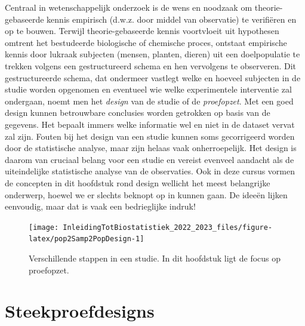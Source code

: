 \documentclass[
  12pt,dutch,coursenotes]{book}
\begin{document}
Centraal in wetenschappelijk onderzoek is de wens en noodzaak om
theorie-gebaseerde kennis empirisch (d.w.z. door middel van observatie) te
verifiëren en op te bouwen. Terwijl theorie-gebaseerde kennis voortvloeit uit hypothesen
omtrent het bestudeerde biologische of chemische proces, ontstaat empirische
kennis door lukraak subjecten (mensen, planten, dieren) uit een doelpopulatie te
trekken volgens een gestructureerd schema en hen vervolgens te observeren.
Dit gestructureerde schema, dat ondermeer vastlegt welke en hoeveel
subjecten in de studie worden opgenomen en eventueel wie welke experimentele
interventie zal ondergaan, noemt men het \emph{design} van de studie of de
\emph{proefopzet}. Met een goed design kunnen betrouwbare conclusies
worden getrokken op basis van de gegevens. Het bepaalt immers welke
informatie wel en niet in de dataset vervat zal zijn. Fouten bij het design
van een studie kunnen soms gecorrigeerd worden door de statistische analyse,
maar zijn helaas vaak onherroepelijk. Het design is daarom van cruciaal
belang voor een studie en vereist evenveel aandacht als de uiteindelijke
statistische analyse van de observaties. Ook in deze cursus vormen de
concepten in dit hoofdstuk rond design wellicht het meest
belangrijke onderwerp, hoewel we er slechts beknopt op in kunnen gaan. De
ideeën lijken eenvoudig, maar dat is vaak een bedrieglijke indruk!

\begin{figure}

{\centering \texttt{[image: InleidingTotBiostatistiek\_2022\_2023\_files/figure-latex/pop2Samp2PopDesign-1]} 

}

\caption{Verschillende stappen in een studie. In dit hoofdstuk ligt de focus op proefopzet.}\label{fig:pop2Samp2PopDesign}
\end{figure}

\hypertarget{sec:steekproefdesigns}{%
\section{Steekproefdesigns}\label{sec:steekproefdesigns}}
\end{document}
